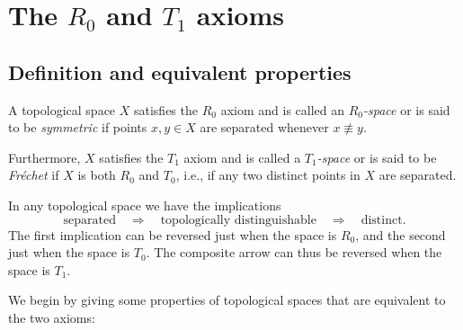 \documentclass[article, a4paper, 11pt, oneside]{memoir}
\numberwithin{equation}{chapter}
\renewcommand{\implies}{\Rightarrow}
\begin{document}



\chapter[The R0 and T1 axioms][The $R_0$ and $T_1$ axioms]{The $R_0$ and $T_1$ axioms}

\section{Definition and equivalent properties}

\begin{definition}
    A topological space $X$ satisfies the $R_0$ axiom and is called an \emph{$R_0$-space} or is said to be \emph{symmetric} if points $x,y \in X$ are separated whenever $x \not\equiv y$.
    
    Furthermore, $X$ satisfies the $T_1$ axiom and is called a \emph{$T_1$-space} or is said to be \emph{Fréchet} if $X$ is both $R_0$ and $T_0$, i.e., if any two distinct points in $X$ are separated.
\end{definition}
%
In any topological space we have the implications
%
\begin{equation*}
    \text{separated}
        \quad \implies \quad
        \text{topologically distinguishable}
        \quad \implies \quad
        \text{distinct}.
\end{equation*}
%
The first implication can be reversed just when the space is $R_0$, and the second just when the space is $T_0$. The composite arrow can thus be reversed when the space is $T_1$.

We begin by giving some properties of topological spaces that are equivalent to the two axioms:
\end{document}
